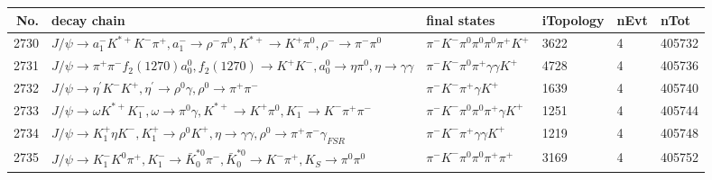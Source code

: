 \begin{table}[htbp] 
\begin{center}
\begin{small}
\begin{tabular}{rlllll}\hline\hline
 No. & decay chain & final states &  iTopology & nEvt & nTot \\\hline
2730&$J/\psi       \rightarrow a_{1}^{-}      K^{*+}         K^{-}          \pi^{+}        , a_{1}^{-}       \rightarrow \rho^{-}      \pi^{0}        , K^{*+}          \rightarrow K^{+}          \pi^{0}        , \rho^{-}       \rightarrow \pi^{-}        \pi^{0}        $&$\pi^{-}        K^{-}          \pi^{0}        \pi^{0}        \pi^{0}        \pi^{+}        K^{+}          $& 3622&    4&405732\\
2731&$J/\psi       \rightarrow \pi^{+}        \pi^{-}        f_{2}(1270)    a_{0}^{0}      , f_{2}(1270)     \rightarrow K^{+}          K^{-}          , a_{0}^{0}       \rightarrow \eta          \pi^{0}        , \eta           \rightarrow \gamma       \gamma       $&$\pi^{-}        K^{-}          \pi^{0}        \pi^{+}        \gamma       \gamma       K^{+}          $& 4728&    4&405736\\
2732&$J/\psi       \rightarrow \eta^{\prime} K^{-}          K^{+}          , \eta^{\prime}  \rightarrow \rho^{0}      \gamma       , \rho^{0}       \rightarrow \pi^{+}        \pi^{-}        $&$\pi^{-}        K^{-}          \pi^{+}        \gamma       K^{+}          $& 1639&    4&405740\\
2733&$J/\psi       \rightarrow \omega         K^{*+}         K_{1}^{-}      , \omega          \rightarrow \pi^{0}        \gamma       , K^{*+}          \rightarrow K^{+}          \pi^{0}        , K_{1}^{-}       \rightarrow K^{-}          \pi^{+}        \pi^{-}        $&$\pi^{-}        K^{-}          \pi^{0}        \pi^{0}        \pi^{+}        \gamma       K^{+}          $& 1251&    4&405744\\
2734&$J/\psi       \rightarrow K_1^{+}        \eta          K^{-}          , K_1^{+}         \rightarrow \rho^{0}      K^{+}          , \eta           \rightarrow \gamma       \gamma       , \rho^{0}       \rightarrow \pi^{+}        \pi^{-}        \gamma_{FSR} $&$\pi^{-}        K^{-}          \pi^{+}        \gamma       \gamma       K^{+}          $& 1219&    4&405748\\
2735&$J/\psi       \rightarrow K_{1}^{-}      K^{0}          \pi^{+}        , K_{1}^{-}       \rightarrow \bar{K}_0^{*0}\pi^{-}        , \bar{K}_0^{*0} \rightarrow K^{-}          \pi^{+}        , K_{S}           \rightarrow \pi^{0}        \pi^{0}        $&$\pi^{-}        K^{-}          \pi^{0}        \pi^{0}        \pi^{+}        \pi^{+}        $& 3169&    4&405752\\

\end{tabular}
\end{small}
\end{center}
\end{table}
